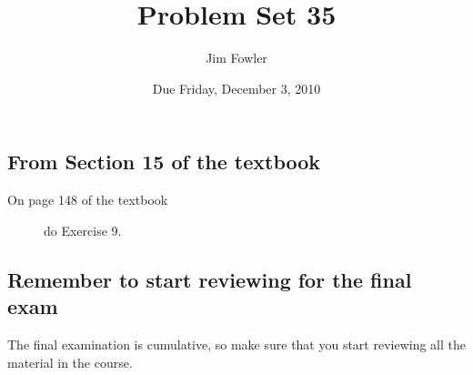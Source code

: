 \documentclass[12pt]{handout}
\author{Jim Fowler}
\title{Problem Set 35}
\date{Due Friday, December  3, 2010}
\begin{document}
\maketitle










\subsection*{From Section 15 of the textbook}



\begin{description}

\item[On page 148 of the textbook] do Exercise 9.

\end{description}













\subsection*{Remember to start reviewing for the final exam}
The final examination is cumulative, so make sure that you start reviewing all the material in the course.
\end{document}
